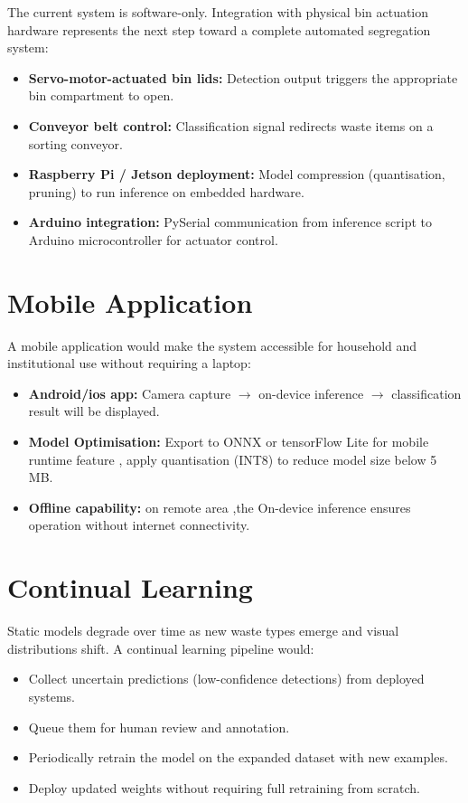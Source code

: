 The current system is software-only. Integration with physical bin actuation hardware represents the next step toward a complete automated segregation system:
\begin{itemize}
    \item \textbf{Servo-motor-actuated bin lids:} Detection output triggers the appropriate bin compartment to open.
    \item \textbf{Conveyor belt control:} Classification signal redirects waste items on a sorting conveyor.
    \item \textbf{Raspberry Pi / Jetson deployment:} Model compression (quantisation, pruning) to run inference on embedded hardware.
    \item \textbf{Arduino integration:} PySerial communication from inference script to Arduino microcontroller for actuator control.
\end{itemize}

\section{Mobile Application}

A mobile application would make the system accessible for household and institutional use without requiring a laptop:
\begin{itemize}
    \item \textbf{Android/ios app:} Camera capture $\rightarrow$ on-device inference $\rightarrow$ classification result will be displayed.
    \item \textbf{Model Optimisation:} Export to ONNX or tensorFlow Lite for mobile runtime feature , apply quantisation (INT8) to reduce model size below 5\,MB.
    \item \textbf{Offline capability:} on remote area ,the On-device inference ensures operation without internet connectivity.
\end{itemize}

\section{Continual Learning}

Static models degrade over time as new waste types emerge and visual distributions shift. A continual learning pipeline would:
\begin{itemize}
    \item Collect uncertain predictions (low-confidence detections) from deployed systems.
    \item Queue them for human review and annotation.
    \item Periodically retrain the model on the expanded dataset with new examples.
    \item Deploy updated weights without requiring full retraining from scratch.
\end{itemize}

